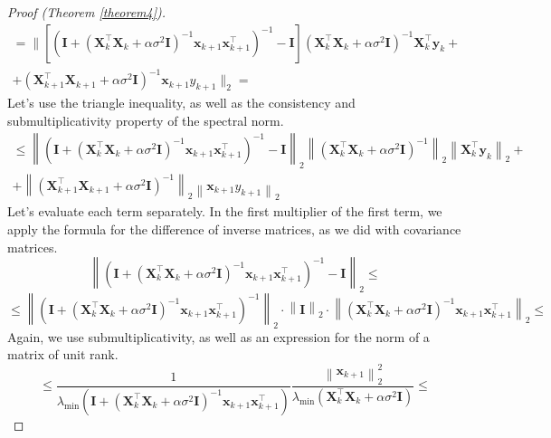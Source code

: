 \documentclass[
11pt,%
tightenlines,%
twoside,%
onecolumn,%
nofloats,%
nobibnotes,%
nofootinbib,%
superscriptaddress,%
noshowpacs,%
centertags]%
{revtex4-2}
\begin{document}
\begin{proof}[Proof (Theorem \ref{theorem4})]
    \begin{multline*}
        = \Bigg\| \left[ \left( \mathbf{I} + \left( \mathbf{X}_k^{\top} \mathbf{X}_k + \alpha \sigma^2 \mathbf{I} \right)^{-1} \mathbf{x}_{k+1} \mathbf{x}_{k+1}^{\top} \right)^{-1} - \mathbf{I} \right] \left( \mathbf{X}_k^{\top} \mathbf{X}_k + \alpha \sigma^2 \mathbf{I} \right)^{-1} \mathbf{X}_k^{\top} \mathbf{y}_k + \\ + \left( \mathbf{X}_{k+1}^{\top} \mathbf{X}_{k+1} + \alpha \sigma^2 \mathbf{I} \right)^{-1} \mathbf{x}_{k+1} y_{k+1} \Bigg\|_2 =
    \end{multline*}
    Let's use the triangle inequality, as well as the consistency and submultiplicativity property of the spectral norm.
    \begin{multline*}
        \leqslant \left\| \left( \mathbf{I} + \left( \mathbf{X}_k^{\top} \mathbf{X}_k + \alpha \sigma^2 \mathbf{I} \right)^{-1} \mathbf{x}_{k+1} \mathbf{x}_{k+1}^{\top} \right)^{-1} - \mathbf{I} \right\|_2 \left\| \left( \mathbf{X}_k^{\top} \mathbf{X}_k + \alpha \sigma^2 \mathbf{I} \right)^{-1} \right\|_2 \left\| \mathbf{X}_k^{\top} \mathbf{y}_k \right\|_2 + \\ + \left\| \left( \mathbf{X}_{k+1}^{\top} \mathbf{X}_{k+1} + \alpha \sigma^2 \mathbf{I} \right)^{-1} \right\|_2 \left\| \mathbf{x}_{k+1} y_{k+1} \right\|_2
    \end{multline*}
    Let's evaluate each term separately. In the first multiplier of the first term, we apply the formula for the difference of inverse matrices, as we did with covariance matrices.
    \[ \left\| \left( \mathbf{I} + \left( \mathbf{X}_k^{\top} \mathbf{X}_k + \alpha \sigma^2 \mathbf{I} \right)^{-1} \mathbf{x}_{k+1} \mathbf{x}_{k+1}^{\top} \right)^{-1} - \mathbf{I} \right\|_2 \leqslant \]
    \[ \leqslant \left\| \left( \mathbf{I} + \left( \mathbf{X}_k^{\top} \mathbf{X}_k + \alpha \sigma^2 \mathbf{I} \right)^{-1} \mathbf{x}_{k+1} \mathbf{x}_{k+1}^{\top} \right)^{-1} \right\|_2 \cdot \left\| \mathbf{I} \right\|_2 \cdot \left\| \left( \mathbf{X}_k^{\top} \mathbf{X}_k + \alpha \sigma^2 \mathbf{I} \right)^{-1} \mathbf{x}_{k+1} \mathbf{x}_{k+1}^{\top} \right\|_2 \leqslant \]
    Again, we use submultiplicativity, as well as an expression for the norm of a matrix of unit rank.
    \[ \leqslant \dfrac{1}{\lambda_{\min}\left( \mathbf{I} + \left( \mathbf{X}_k^{\top} \mathbf{X}_k + \alpha \sigma^2 \mathbf{I} \right)^{-1} \mathbf{x}_{k+1} \mathbf{x}_{k+1}^{\top} \right)} \dfrac{\left\| \mathbf{x}_{k+1} \right\|_2^2}{\lambda_{\min}\left( \mathbf{X}_k^{\top} \mathbf{X}_k + \alpha \sigma^2 \mathbf{I} \right)} \leqslant \]

\end{proof}
\end{document}
